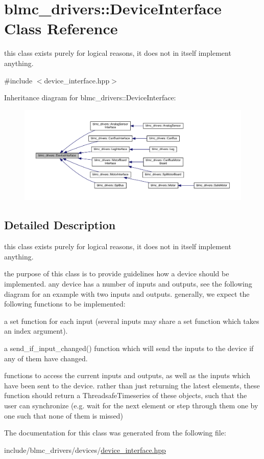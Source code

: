 \hypertarget{classblmc__drivers_1_1DeviceInterface}{}\section{blmc\+\_\+drivers\+:\+:Device\+Interface Class Reference}
\label{classblmc__drivers_1_1DeviceInterface}


this class exists purely for logical reasons, it does not in itself implement anything.  




{\ttfamily \#include $<$device\+\_\+interface.\+hpp$>$}



Inheritance diagram for blmc\+\_\+drivers\+:\+:Device\+Interface\+:
\nopagebreak
\begin{figure}[H]
\begin{center}
\leavevmode
\includegraphics[width=350pt]{classblmc__drivers_1_1DeviceInterface__inherit__graph}
\end{center}
\end{figure}


\subsection{Detailed Description}
this class exists purely for logical reasons, it does not in itself implement anything. 

the purpose of this class is to provide guidelines how a device should be implemented. any device has a number of inputs and outputs, see the following diagram for an example with two inputs and outputs.  generally, we expect the following functions to be implemented\+:
\begin{DoxyItemize}
\item a set function for each input (several inputs may share a set function which takes an index argument).
\item a send\+\_\+if\+\_\+input\+\_\+changed() function which will send the inputs to the device if any of them have changed.
\item functions to access the current inputs and outputs, as well as the inputs which have been sent to the device. rather than just returning the latest elements, these function should return a Threadsafe\+Timeseries of these objects, such that the user can synchronize (e.\+g. wait for the next element or step through them one by one such that none of them is missed) 
\end{DoxyItemize}

The documentation for this class was generated from the following file\+:\begin{DoxyCompactItemize}
\item 
include/blmc\+\_\+drivers/devices/\hyperlink{device__interface_8hpp}{device\+\_\+interface.\+hpp}\end{DoxyCompactItemize}
